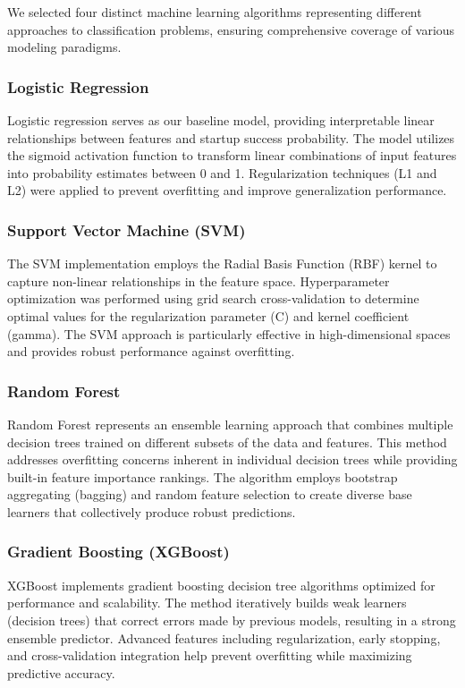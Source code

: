 \documentclass[conference]{IEEEtran}
\begin{document}
We selected four distinct machine learning algorithms representing different approaches to classification problems, ensuring comprehensive coverage of various modeling paradigms.

\subsubsection{Logistic Regression}
Logistic regression serves as our baseline model, providing interpretable linear relationships between features and startup success probability. The model utilizes the sigmoid activation function to transform linear combinations of input features into probability estimates between 0 and 1. Regularization techniques (L1 and L2) were applied to prevent overfitting and improve generalization performance.

\subsubsection{Support Vector Machine (SVM)}
The SVM implementation employs the Radial Basis Function (RBF) kernel to capture non-linear relationships in the feature space. Hyperparameter optimization was performed using grid search cross-validation to determine optimal values for the regularization parameter (C) and kernel coefficient (gamma). The SVM approach is particularly effective in high-dimensional spaces and provides robust performance against overfitting.

\subsubsection{Random Forest}
Random Forest represents an ensemble learning approach that combines multiple decision trees trained on different subsets of the data and features. This method addresses overfitting concerns inherent in individual decision trees while providing built-in feature importance rankings. The algorithm employs bootstrap aggregating (bagging) and random feature selection to create diverse base learners that collectively produce robust predictions.

\subsubsection{Gradient Boosting (XGBoost)}
XGBoost implements gradient boosting decision tree algorithms optimized for performance and scalability. The method iteratively builds weak learners (decision trees) that correct errors made by previous models, resulting in a strong ensemble predictor. Advanced features including regularization, early stopping, and cross-validation integration help prevent overfitting while maximizing predictive accuracy.
\end{document}
